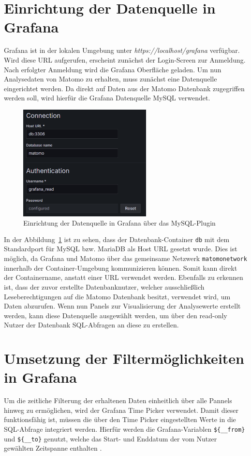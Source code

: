 \section{Einrichtung der Datenquelle in Grafana}
Grafana ist in der lokalen Umgebung unter \textit{https://localhost/grafana} verfügbar. Wird diese URL aufgerufen, erscheint zunächst der Login-Screen zur Anmeldung. Nach erfolgter Anmeldung wird die Grafana Oberfläche geladen. Um nun Analysedaten von Matomo zu erhalten, muss zunächst eine Datenquelle eingerichtet werden. Da direkt auf Daten aus der Matomo Datenbank zugegriffen werden soll, wird hierfür die Grafana Datenquelle \glqq MySQL\grqq{} verwendet.

\begin{figure}[H]
    \centering
    \includegraphics[width=0.6\textwidth, keepaspectratio]{images/datasource.png}
    \caption{Einrichtung der Datenquelle in Grafana über das MySQL-Plugin}
    \label{fig:datasource}
\end{figure}

In der Abbildung~\ref{fig:datasource} ist zu sehen, dass der Datenbank-Container \texttt{db} mit dem Standardport für MySQL bzw. MariaDB als Host URL gesetzt wurde. Dies ist möglich, da Grafana und Matomo über das gemeinsame Netzwerk \texttt{matomo\textunderscore network} innerhalb der Container-Umgebung kommunizieren können. Somit kann direkt der Containername, anstatt einer URL verwendet werden. Ebenfalls zu erkennen ist, dass der zuvor erstellte Datenbanknutzer, welcher ausschließlich Leseberechtigungen auf die Matomo Datenbank besitzt, verwendet wird, um Daten abzurufen. Wenn nun Panels zur Visualisierung der Analysewerte erstellt werden, kann diese Datenquelle ausgewählt werden, um über den read-only Nutzer der Datenbank SQL-Abfragen an diese zu erstellen.

\section{Umsetzung der Filtermöglichkeiten in Grafana}
Um die zeitliche Filterung der erhaltenen Daten einheitlich über alle Pannels hinweg zu ermöglichen, wird der Grafana Time Picker verwendet. Damit dieser funktionsfähig ist, müssen die über den Time Picker eingestellten Werte in die SQL-Abfrage integriert werden. Hierfür werden die Grafana-Variablen \texttt{\$\{\_\_from\}} und \texttt{\$\{\_\_to\}} genutzt, welche das Start- und Enddatum der vom Nutzer gewählten Zeitspanne enthalten \parencite{GrafanaTimePickerVariables}. 

